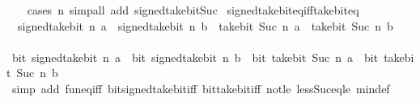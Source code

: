 \begin{isabellebody}
%
\isadelimproof
\ \ %
\endisadelimproof
%
\isatagproof
{}\isamarkupfalse%
\ {\isacharparenleft}{\kern0pt}cases\ n{\isacharparenright}{\kern0pt}\ {\isacharparenleft}{\kern0pt}simp{\isacharunderscore}{\kern0pt}all\ add{\isacharcolon}{\kern0pt}\ signed{\isacharunderscore}{\kern0pt}take{\isacharunderscore}{\kern0pt}bit{\isacharunderscore}{\kern0pt}Suc{\isacharparenright}{\kern0pt}%
\endisatagproof
{\isafoldproof}%
%
\isadelimproof
\isanewline
%
\endisadelimproof
\isanewline
{}\isamarkupfalse%
\ signed{\isacharunderscore}{\kern0pt}take{\isacharunderscore}{\kern0pt}bit{\isacharunderscore}{\kern0pt}eq{\isacharunderscore}{\kern0pt}iff{\isacharunderscore}{\kern0pt}take{\isacharunderscore}{\kern0pt}bit{\isacharunderscore}{\kern0pt}eq{\isacharcolon}{\kern0pt}\isanewline
\ \ {\isacartoucheopen}signed{\isacharunderscore}{\kern0pt}take{\isacharunderscore}{\kern0pt}bit\ n\ a\ {\isacharequal}{\kern0pt}\ signed{\isacharunderscore}{\kern0pt}take{\isacharunderscore}{\kern0pt}bit\ n\ b\ {\isasymlongleftrightarrow}\ take{\isacharunderscore}{\kern0pt}bit\ {\isacharparenleft}{\kern0pt}Suc\ n{\isacharparenright}{\kern0pt}\ a\ {\isacharequal}{\kern0pt}\ take{\isacharunderscore}{\kern0pt}bit\ {\isacharparenleft}{\kern0pt}Suc\ n{\isacharparenright}{\kern0pt}\ b{\isacartoucheclose}\isanewline
%
\isadelimproof
%
\endisadelimproof
%
\isatagproof
{}\isamarkupfalse%
\ {\isacharminus}{\kern0pt}\isanewline
\ \ \isamarkupfalse%
\ {\isacartoucheopen}bit\ {\isacharparenleft}{\kern0pt}signed{\isacharunderscore}{\kern0pt}take{\isacharunderscore}{\kern0pt}bit\ n\ a{\isacharparenright}{\kern0pt}\ {\isacharequal}{\kern0pt}\ bit\ {\isacharparenleft}{\kern0pt}signed{\isacharunderscore}{\kern0pt}take{\isacharunderscore}{\kern0pt}bit\ n\ b{\isacharparenright}{\kern0pt}\ {\isasymlongleftrightarrow}\ bit\ {\isacharparenleft}{\kern0pt}take{\isacharunderscore}{\kern0pt}bit\ {\isacharparenleft}{\kern0pt}Suc\ n{\isacharparenright}{\kern0pt}\ a{\isacharparenright}{\kern0pt}\ {\isacharequal}{\kern0pt}\ bit\ {\isacharparenleft}{\kern0pt}take{\isacharunderscore}{\kern0pt}bit\ {\isacharparenleft}{\kern0pt}Suc\ n{\isacharparenright}{\kern0pt}\ b{\isacharparenright}{\kern0pt}{\isacartoucheclose}\isanewline
\ \ \ \ \isamarkupfalse%
\ {\isacharparenleft}{\kern0pt}simp\ add{\isacharcolon}{\kern0pt}\ fun{\isacharunderscore}{\kern0pt}eq{\isacharunderscore}{\kern0pt}iff\ bit{\isacharunderscore}{\kern0pt}signed{\isacharunderscore}{\kern0pt}take{\isacharunderscore}{\kern0pt}bit{\isacharunderscore}{\kern0pt}iff\ bit{\isacharunderscore}{\kern0pt}take{\isacharunderscore}{\kern0pt}bit{\isacharunderscore}{\kern0pt}iff\ not{\isacharunderscore}{\kern0pt}le\ less{\isacharunderscore}{\kern0pt}Suc{\isacharunderscore}{\kern0pt}eq{\isacharunderscore}{\kern0pt}le\ min{\isacharunderscore}{\kern0pt}def{\isacharparenright}{\kern0pt}\isanewline

\end{isabellebody}
